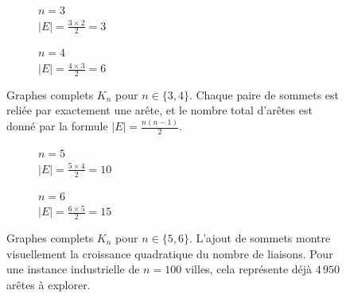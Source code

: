 \documentclass[12pt, a4paper, twoside, openright]{book}
\begin{document}
	\begin{figure}[H]
		\centering
		\begin{subfigure}[b]{0.45\textwidth}
			\centering
			\vspace{2pt}
			\caption*{\footnotesize $n = 3$\\[2pt]
				$|E| = \frac{3 \times 2}{2} = 3$}
		\end{subfigure}
		\hfill
		\begin{subfigure}[b]{0.45\textwidth}
			\centering
			\vspace{2pt}
			\caption*{\footnotesize $n = 4$\\[2pt]
				$|E| = \frac{4 \times 3}{2} = 6$}
		\end{subfigure}
		\vspace{2pt}
		\caption{Graphes complets $K_n$ pour $n \in \{3, 4\}$. Chaque paire de sommets est reliée par exactement une arête, et le nombre total d'arêtes est donné par la formule $|E| = \frac{n(n-1)}{2}$.}
		\label{fig:graphes_complets_3_4}
	\end{figure}
	
	
	\begin{figure}[H]
		\centering
		\begin{subfigure}[b]{0.45\textwidth}
			\centering
			\vspace{2pt}
			\caption*{\footnotesize $n = 5$\\[2pt]
				$|E| = \frac{5 \times 4}{2} = 10$}
		\end{subfigure}
		\hfill
		\begin{subfigure}[b]{0.45\textwidth}
			\centering
			\vspace{2pt}
			\caption*{\footnotesize $n = 6$\\[2pt]
				$|E| = \frac{6 \times 5}{2} = 15$}
		\end{subfigure}
		\vspace{2pt}
		\caption{Graphes complets $K_n$ pour $n \in \{5, 6\}$. L'ajout de sommets montre visuellement la croissance quadratique du nombre de liaisons. Pour une instance industrielle de $n = 100$ villes, cela représente déjà $4\,950$ arêtes à explorer.}
		\label{fig:graphes_complets_5_6}
	\end{figure}
	
\end{document}
